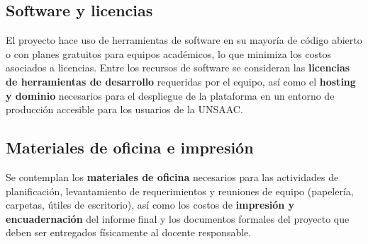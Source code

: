 \subsection*{Software y licencias}

El proyecto hace uso de herramientas de software en su mayoría de código abierto o con
planes gratuitos para equipos académicos, lo que minimiza los costos asociados a licencias.
Entre los recursos de software se consideran las \textbf{licencias de herramientas de
desarrollo} requeridas por el equipo, así como el \textbf{hosting y dominio} necesarios
para el despliegue de la plataforma en un entorno de producción accesible para los usuarios
de la UNSAAC.

\subsection*{Materiales de oficina e impresión}

Se contemplan los \textbf{materiales de oficina} necesarios para las actividades de
planificación, levantamiento de requerimientos y reuniones de equipo (papelería, carpetas,
útiles de escritorio), así como los costos de \textbf{impresión y encuadernación} del
informe final y los documentos formales del proyecto que deben ser entregados físicamente
al docente responsable.

